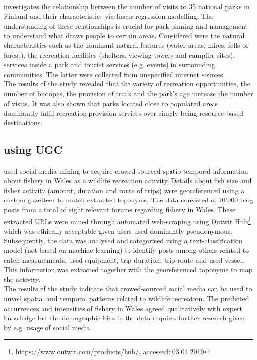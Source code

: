 \paragraph*{\textcite{Neuvonen2010}} investigates the relationship between the number of visits to 35 national parks in Finland and their characteristics via linear regression modelling. The understanding of these relationships is crucial for park planing and management to understand what draws people to certain areas. Considered were the natural characteristics such as the dominant natural features (water areas, mires, fells or forest), the recreation facilities (shelters, viewing towers and campfire sites), services inside a park and tourist services (e.g. events) in surrounding communities. The latter were collected from unspecified internet sources.\\
The results of the study revealed that the variety of recreation opportunities, the number of biotopes, the provision of trails and the park's age increase the number of visits. It was also shown that parks located close to populated areas dominantly fulfil recreation-provision services over simply being resource-based destinations.

\subsection{using UGC} 

\paragraph*{\textcite{Monkman2018}} used social media mining to acquire crowed-sourced spatio-temporal information about fishery in Wales as a wildlife recreation activity. Details about fish size and fisher activity (amount, duration and route of trips) were georeferenced using a custom gazetteer to match extracted toponyms. The data consisted of 10'000 blog posts from a total of eight relevant forums regarding fishery in Wales. These extracted URLs were mined through automated web-scraping using Outwit Hub\footnote{https://www.outwit.com/products/hub/, accessed: 03.04.2019} which was ethically acceptable given users used dominantly pseudonymous. Subsequently, the data was analysed and categorised using a text-classification model (not based on machine learning) to identify posts among others related to catch measurements, used equipment, trip duration, trip route and used vessel. This information was extracted together with the georeferenced toponyms to map the activity. \\
The results of the study indicate that crowed-sourced social media can be used to unveil spatial and temporal patterns related to wildlife recreation. The predicted occurrences and intensities of fishery in Wales agreed qualitatively with expert knowledge but the demographic bias in the data requires further research given by e.g. usage of social media.

